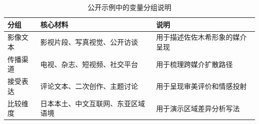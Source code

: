 \begin{table}[H]
  \centering
  \caption{公开示例中的变量分组说明}
  \label{tab:variables}
  \begin{tabularx}{0.92\textwidth}{@{}lXX@{}}
    \toprule
    分组 & 核心材料 & 说明 \\
    \midrule
    影像文本 & 影视片段、写真视觉、公开访谈 & 用于描述佐佐木希形象的媒介呈现 \\
    传播渠道 & 电视、杂志、短视频、社交平台 & 用于梳理跨媒介扩散路径 \\
    接受表达 & 评论文本、二次创作、主题讨论 & 用于呈现审美评价和情感投射 \\
    比较维度 & 日本本土、中文互联网、东亚区域语境 & 用于演示区域差异分析写法 \\
    \bottomrule
  \end{tabularx}
\end{table}
